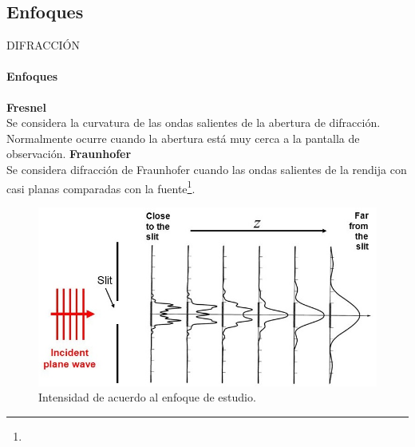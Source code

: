 \subsection{Enfoques}
\begin{frame}{DIFRACCIÓN}
    \framesubtitle{Enfoques}
    \begin{multicols}{2}
        \textbf{Fresnel}\\
            Se considera la curvatura de las ondas salientes de la abertura de difracción. Normalmente ocurre cuando la abertura está muy cerca a la pantalla de observación.
        \vfill\null
        \textbf{Fraunhofer}\\
            Se considera difracción de Fraunhofer cuando las ondas salientes de la rendija con casi planas comparadas con la fuente\footnote{}.
    \end{multicols}
    \begin{figure}[H]
        \centering
        \includegraphics[scale=0.3]{david/enfoques.jpg}
        \caption{Intensidad de acuerdo al enfoque de estudio\footnotemark{}.}
    \end{figure}
    \vspace{-1.5cm}
\end{frame}

